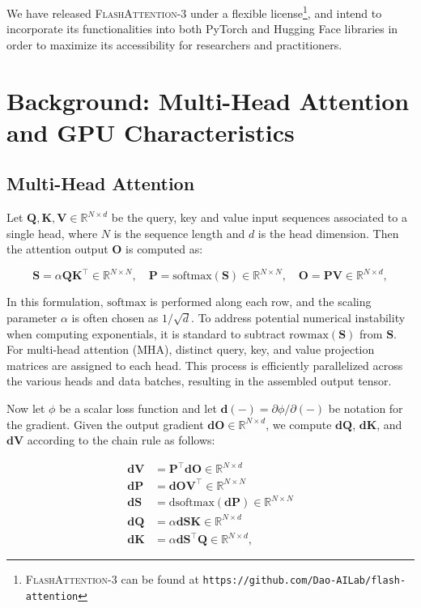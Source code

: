 \begin{enumerate}
We have released \textsc{FlashAttention-3} under a flexible license\footnote{\textsc{FlashAttention-3}
  can be found at \texttt{https://github.com/Dao-AILab/flash-attention}}, and intend to incorporate its functionalities into both PyTorch and Hugging Face libraries in order to maximize its accessibility for researchers and practitioners.

\section{Background: Multi-Head Attention and GPU Characteristics}
\label{sec:background}

\subsection{Multi-Head Attention}
\label{subsec:multi_head_attn}

Let $\mathbf{Q}, \mathbf{K}, \mathbf{V} \in \mathbb{R}^{N \times d}$ be the query, key and value input sequences associated to a single head, where $N$ is the sequence length and $d$ is the head dimension. Then the attention output $\mathbf{O}$ is computed as:

\begin{equation*}
  \mathbf{S} = \alpha \mathbf{Q} \mathbf{K}^\top \in \mathbb{R}^{N \times N}, \quad \mathbf{P} = \mathrm{softmax}(\mathbf{S}) \in \mathbb{R}^{N \times N}, \quad \mathbf{O} = \mathbf{P}\mathbf{V} \in \mathbb{R}^{N \times d},
\end{equation*}

In this formulation, $\mathrm{softmax}$ is performed along each row, and the scaling parameter $\alpha$ is often chosen as $1/\sqrt{d}$. To address potential numerical instability when computing exponentials, it is standard to subtract $\mathrm{rowmax}(\mathbf{S})$ from $\mathbf{S}$. For multi-head attention (MHA), distinct query, key, and value projection matrices are assigned to each head. This process is efficiently parallelized across the various heads and data batches, resulting in the assembled output tensor.

Now let $\phi$ be a scalar loss function and let $\mathbf{d}(-) = \partial \phi / \partial (-)$ be notation for the gradient. Given the output gradient $\mathbf{dO} \in \mathbb{R}^{N \times d}$, we compute $\mathbf{dQ}$, $\mathbf{dK}$, and $\mathbf{dV}$ according to the chain rule as follows:

\begin{align*}
  \mathbf{dV} &= \mathbf{P}^\top \mathbf{dO} \in \mathbb{R}^{N \times d} \\
  \mathbf{dP} &= \mathbf{dO} \mathbf{V}^\top \in \mathbb{R}^{N \times N} \\
  \mathbf{dS} &= \mathrm{dsoftmax} (\mathbf{dP}) \in \mathbb{R}^{N \times N} \\
  \mathbf{dQ} &= \alpha \mathbf{dS} \mathbf{K} \in \mathbb{R}^{N \times d} \\
  \mathbf{dK} &= \alpha \mathbf{dS}^\top \mathbf{Q} \in \mathbb{R}^{N \times d},
\end{align*}


\end{enumerate}
